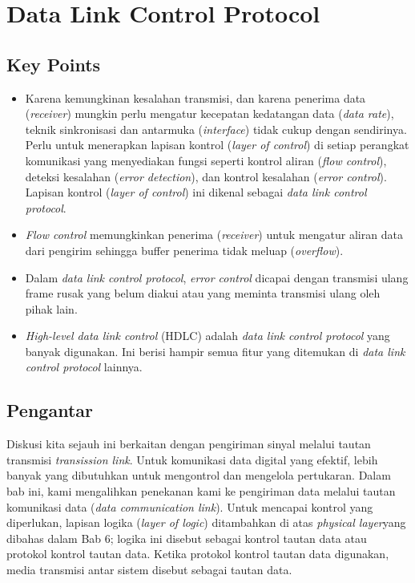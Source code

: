 
\chapter{Data Link Control Protocol}

\section{Key Points}
\begin{itemize}
	\item Karena kemungkinan kesalahan transmisi, dan karena penerima data (\textit{receiver}) mungkin perlu mengatur kecepatan kedatangan data (\textit{data rate}), teknik sinkronisasi dan antarmuka (\textit{interface}) tidak cukup dengan sendirinya. Perlu untuk menerapkan lapisan kontrol (\textit{layer of control}) di setiap perangkat komunikasi yang menyediakan fungsi seperti kontrol aliran (\textit{flow control}), deteksi kesalahan (\textit{error detection}), dan kontrol kesalahan (\textit{error control}). Lapisan kontrol (\textit{layer of control}) ini dikenal sebagai \textit{data link control protocol}.

	\item \textit{Flow control} memungkinkan penerima (\textit{receiver}) untuk mengatur aliran data dari pengirim sehingga buffer penerima tidak meluap (\textit{overflow}).
	
	\item Dalam \textit{data link control protocol}, \textit{error control} dicapai dengan transmisi ulang frame rusak yang belum diakui atau yang meminta transmisi ulang oleh pihak lain.
	
	\item \textit{High-level data link control} (HDLC) adalah \textit{data link control protocol} yang banyak digunakan. Ini berisi hampir semua fitur yang ditemukan di \textit{data link control protocol} lainnya.
\end{itemize}


\section{Pengantar}

Diskusi kita sejauh ini berkaitan dengan pengiriman sinyal melalui tautan transmisi \textit{transission link}. Untuk komunikasi data digital yang efektif, lebih banyak yang dibutuhkan untuk mengontrol dan mengelola pertukaran. Dalam bab ini, kami mengalihkan penekanan kami ke pengiriman data melalui tautan komunikasi data (\textit{data communication link}). Untuk mencapai kontrol yang diperlukan, lapisan logika (\textit{layer of logic}) ditambahkan di atas \textit{physical layer}yang dibahas dalam Bab 6; logika ini disebut sebagai kontrol tautan data atau protokol kontrol tautan data. Ketika protokol kontrol tautan data digunakan, media transmisi antar sistem disebut sebagai tautan data.

